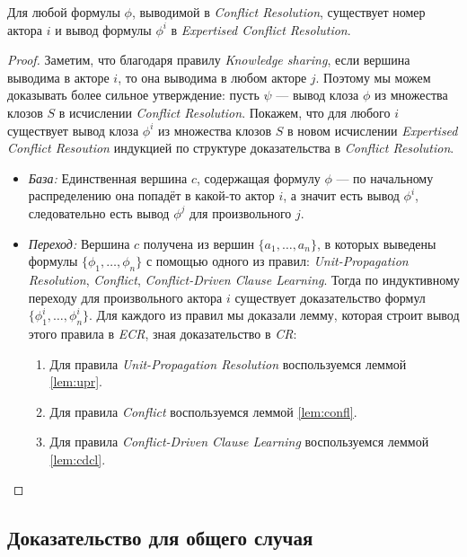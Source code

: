 \begin{theorem}
Для любой формулы $\phi$, выводимой в \emph{Conflict Resolution}, существует номер актора $i$ и вывод формулы $\phi^i$ в \emph{Expertised Conflict Resolution}.
\end{theorem}
\begin{proof}
Заметим, что благодаря правилу \emph{Knowledge sharing}, если вершина выводима в акторе $i$, то она выводима в любом акторе $j$. Поэтому мы можем доказывать более сильное утверждение:
пусть $\psi$ --- вывод клоза $\phi$ из множества клозов $S$ в исчислении \emph{Conflict Resolution}. Покажем, что для любого $i$ существует вывод клоза $\phi^i$ из множества клозов $S$ в новом исчислении \emph{Expertised Conflict Resoution} индукцией по структуре доказательства в \emph{Conflict Resolution}.

\begin{itemize}[label=$\star$] 
\item \emph{База:} Единственная вершина $c$, содержащая формулу $\phi$ --- по начальному распределению она попадёт в какой-то актор $i$, а значит есть вывод $\phi^i$, следовательно есть вывод $\phi^j$ для произвольного $j$.
\item \emph{Переход:} Вершина $c$ получена из вершин $\{a_1, \ldots, a_n\}$, в которых выведены формулы $\{\phi_1, \ldots, \phi_n\}$ с помощью одного из правил: \emph{Unit-Propagation Resolution}, \emph{Conflict}, \emph{Conflict-Driven Clause Learning}. Тогда по индуктивному переходу для произвольного актора $i$ существует доказательство формул $\{\phi_1^i, \ldots, \phi_n^i\}$. Для каждого из правил мы доказали лемму, которая строит вывод этого правила в \emph{ECR}, зная доказательство в \emph{CR}: 
\begin{enumerate}
	\item Для правила \emph{Unit-Propagation Resolution} воспользуемся леммой \ref{lem:upr}.
    \item Для правила \emph{Conflict} воспользуемся леммой \ref{lem:confl}.
    \item Для правила \emph{Conflict-Driven Clause Learning} воспользуемся леммой \ref{lem:cdcl}.
\end{enumerate}
\end{itemize}
\end{proof}

\subsection{Доказательство для общего случая}

